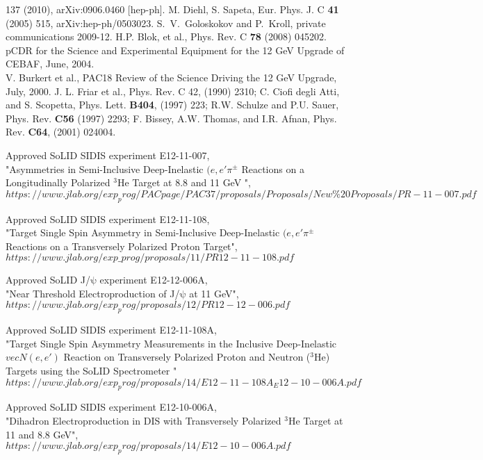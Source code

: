 \begin{thebibliography}{}
  137 (2010), arXiv:0906.0460 [hep-ph].
 M. Diehl, S. Sapeta, Eur. Phys. J. C {\bf 41} (2005) 515,
  arXiv:hep-ph/0503023.
 S.~V.~Goloskokov and P.~Kroll, private communications 2009-12.
 H.P. Blok, et al., Phys. Rev. C {\bf 78} (2008) 045202.
 pCDR for the Science and Experimental Equipment for the 12 GeV
  Upgrade of CEBAF, June, 2004.\\
V. Burkert et al., PAC18 Review of the Science Driving the 12 GeV Upgrade, 
  July, 2000.
J. L. Friar et al., Phys. Rev. C 42, (1990) 2310; C. Ciofi
degli Atti, and S. Scopetta, Phys. Lett. {\bf B404}, (1997) 223; R.W. Schulze
and P.U. Sauer, Phys. Rev. {\bf C56} (1997) 2293; F. Bissey, A.W. Thomas, and
I.R. Afnan, Phys. Rev. {\bf C64}, (2001) 024004.

  Approved SoLID SIDIS experiment E12-11-007,\\
"Asymmetries in Semi-Inclusive Deep-Inelastic  $(e,e'\pi^{\pm}$ Reactions on a Longitudinally Polarized $\mathrm{^{3}He}$ Target at 8.8 and 11 GeV ",\\
$https://www.jlab.org/exp_prog/PACpage/PAC37/proposals/Proposals/New\%20Proposals/PR-11-007.pdf$

  Approved SoLID SIDIS experiment E12-11-108,\\
"Target Single Spin Asymmetry in Semi-Inclusive Deep-Inelastic $(e,e'\pi^{\pm}$ Reactions on a Transversely Polarized Proton Target",\\
$https://www.jlab.org/exp\_prog/proposals/11/PR12-11-108.pdf$

  Approved SoLID J/$\mathrm{\psi}$ experiment E12-12-006A,\\
  "Near Threshold Electroproduction of J/$\mathrm{\psi}$ at 11 GeV",\\
$https://www.jlab.org/exp_prog/proposals/12/PR12-12-006.pdf$

   Approved SoLID SIDIS experiment E12-11-108A,\\
"Target Single Spin Asymmetry Measurements in the Inclusive Deep-Inelastic $vec{N}(e,e')$ Reaction on Transversely Polarized Proton and Neutron ($\mathrm{^{3}He}$) Targets using the SoLID Spectrometer "\\
$https://www.jlab.org/exp_prog/proposals/14/E12-11-108A_E12-10-006A.pdf$

  Approved SoLID SIDIS experiment E12-10-006A,\\
  "Dihadron Electroproduction in DIS with  Transversely Polarized $\mathrm{^{3}He}$ Target at 11 and 8.8 GeV",\\
$https://www.jlab.org/exp_prog/proposals/14/E12-10-006A.pdf$


\end{thebibliography}
